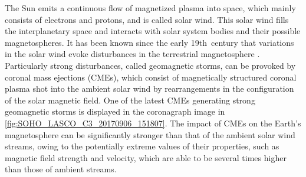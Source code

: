 The Sun emits a continuous flow of magnetized plasma into space, which mainly consists of electrons and protons, and is called solar wind. This solar wind fills the interplanetary space and interacts with solar system bodies and their possible magnetospheres. It has been known since the early 19th~century that variations in the solar wind evoke disturbances in the terrestrial magnetosphere \citep{Bartels1962}.
Particularly strong disturbances, called geomagnetic storms, can be provoked by coronal mass ejections (CMEs), which consist of magnetically structured coronal plasma shot into the ambient solar wind by rearrangements in the configuration of the solar magnetic field. One of the latest CMEs generating strong geomagnetic storms is displayed in the coronagraph image in \autoref{fig:SOHO_LASCO_C3_20170906_151807}. The impact of CMEs on the Earth's magnetosphere can be significantly stronger than that of the ambient solar wind streams, owing to the potentially extreme values of their properties, such as magnetic field strength and velocity, which are able to be several times higher than those of ambient streams.
\begin{figure}[htb]
\end{figure}

